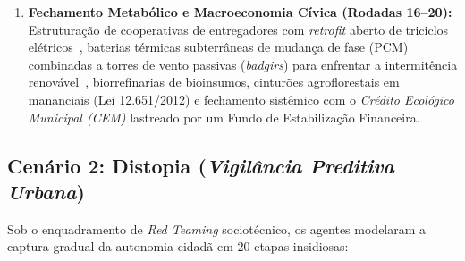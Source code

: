 \documentclass[runningheads]{llncs}
\begin{document}
\begin{enumerate}
    \item \textbf{Fechamento Metab\'olico e Macroeconomia C\'ivica (Rodadas 16--20):} Estrutura\c{c}\~ao de cooperativas de entregadores com \emph{retrofit} aberto de triciclos el\'etricos~\cite{vanin2020cooperativismo}, baterias t\'ermicas subterr\^aneas de mudan\c{c}a de fase (PCM) combinadas a torres de vento passivas (\emph{badgirs}) para enfrentar a intermit\^encia renov\'avel~\cite{oliveira2023flexibilidade}, biorrefinarias de bioinsumos, cintur\~oes agroflorestais em mananciais (Lei 12.651/2012) e fechamento sist\^emico com o \emph{Cr\'edito Ecol\'ogico Municipal (CEM)} lastreado por um Fundo de Estabiliza\c{c}\~ao Financeira.
\end{enumerate}

\subsection{Cen\'ario 2: Distopia (\emph{Vigil\^ancia Preditiva Urbana})}
Sob o enquadramento de \emph{Red Teaming} sociot\'ecnico, os agentes modelaram a captura gradual da autonomia cidad\~a em 20 etapas insidiosas:
\end{document}
